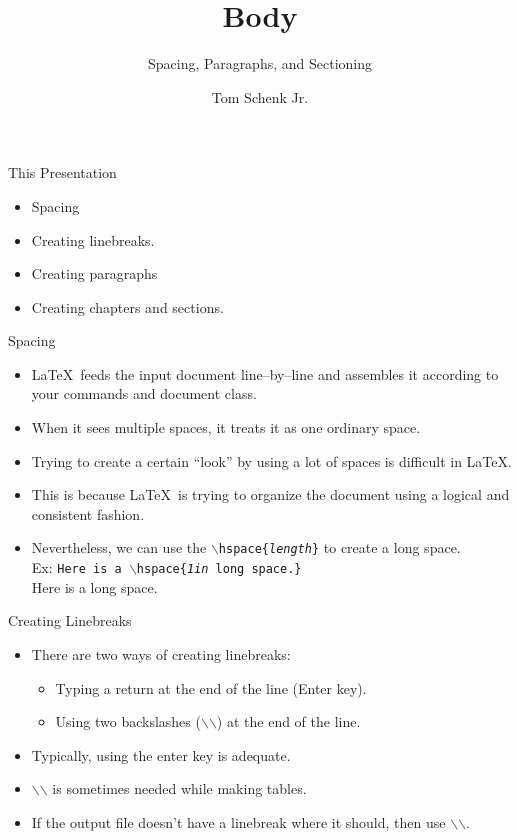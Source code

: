 \documentclass[pdf]{prosper}
\title{Body}
\subtitle{Spacing, Paragraphs, and Sectioning}
\author{Tom Schenk Jr.}		%
\begin{document}
\maketitle
\begin{slide}{This Presentation}
	\begin{itemize}
		\item Spacing
		\item Creating linebreaks.
		\item Creating paragraphs
		\item Creating chapters and sections.
	\end{itemize}
\end{slide}
\begin{slide}{Spacing}
	\begin{itemize}
		\item \LaTeX\ feeds the input document line--by--line and assembles it according to your commands and document class.
		\item When it sees multiple spaces, it treats it as one ordinary space.
		\item Trying to create a certain ``look'' by using a lot of spaces is difficult in \LaTeX.
		\item This is because \LaTeX\ is trying to organize the document using a logical and consistent fashion.
		\item Nevertheless, we can use the \texttt{$\backslash$hspace\{\textit{length}\}} to create a long space.	\\
		Ex: \texttt{Here is a \texttt{$\backslash$hspace\{\textit{1in} long space.\}}} \\
		Here is a \hspace{1in} long space. \\
	\end{itemize}
\end{slide}
\begin{slide}{Creating Linebreaks}
	\begin{itemize}
		\item There are two ways of creating linebreaks:
			\begin{itemize}
				\item Typing a return at the end of the line (Enter key).
				\item Using two backslashes ($\backslash$$\backslash$) at the end of the line.
			\end{itemize}
		\item Typically, using the enter key is adequate.
		\item $\backslash$$\backslash$ is sometimes needed while making tables.
		\item If the output file doesn't have a linebreak where it should, then use $\backslash$$\backslash$.
	\end{itemize}
\end{slide}
\end{document}

